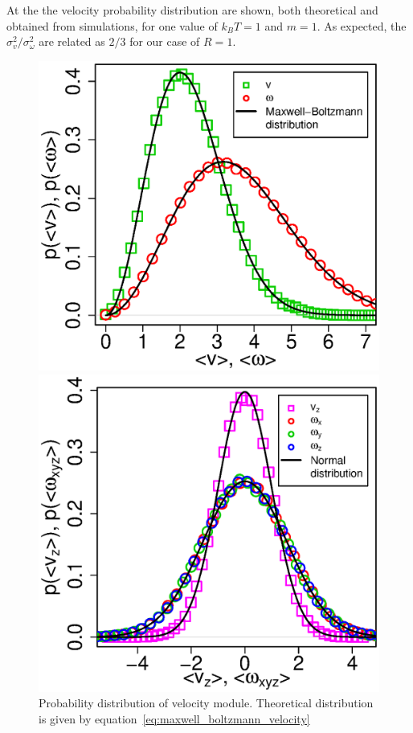 At the  the velocity probability distribution are shown, both theoretical and obtained from simulations, for one value of $k_BT = 1$ and $m = 1$. As expected, the $\sigma^2_v / \sigma^2_\omega$ are related as $2/3$ for our case of $R = 1$.
\begin{figure}[t]
\centering
	\begin{minipage}[c]{0.7\columnwidth}
		\includegraphics[width=\textwidth]{Images/DiffusionStats_mb}
		\caption{Probability distribution of velocity module. Theoretical distribution is given by equation~\eqref{eq:maxwell_boltzmann_velocity}}
	\end{minipage}
	\begin{minipage}[c]{0.7\columnwidth}
		\includegraphics[width=\textwidth]{Images/DiffusionStats_norm}

\end{minipage}
\end{figure}
